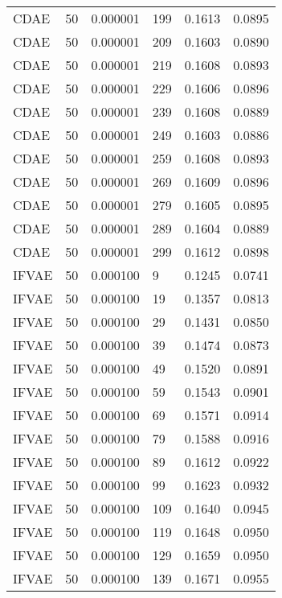 \begin{tabular}{llrlrr}
    CDAE &   50 &  0.000001 &   199 &  0.1613 &       0.0895 \\
    CDAE &   50 &  0.000001 &   209 &  0.1603 &       0.0890 \\
    CDAE &   50 &  0.000001 &   219 &  0.1608 &       0.0893 \\
    CDAE &   50 &  0.000001 &   229 &  0.1606 &       0.0896 \\
    CDAE &   50 &  0.000001 &   239 &  0.1608 &       0.0889 \\
    CDAE &   50 &  0.000001 &   249 &  0.1603 &       0.0886 \\
    CDAE &   50 &  0.000001 &   259 &  0.1608 &       0.0893 \\
    CDAE &   50 &  0.000001 &   269 &  0.1609 &       0.0896 \\
    CDAE &   50 &  0.000001 &   279 &  0.1605 &       0.0895 \\
    CDAE &   50 &  0.000001 &   289 &  0.1604 &       0.0889 \\
    CDAE &   50 &  0.000001 &   299 &  0.1612 &       0.0898 \\
   IFVAE &   50 &  0.000100 &     9 &  0.1245 &       0.0741 \\
   IFVAE &   50 &  0.000100 &    19 &  0.1357 &       0.0813 \\
   IFVAE &   50 &  0.000100 &    29 &  0.1431 &       0.0850 \\
   IFVAE &   50 &  0.000100 &    39 &  0.1474 &       0.0873 \\
   IFVAE &   50 &  0.000100 &    49 &  0.1520 &       0.0891 \\
   IFVAE &   50 &  0.000100 &    59 &  0.1543 &       0.0901 \\
   IFVAE &   50 &  0.000100 &    69 &  0.1571 &       0.0914 \\
   IFVAE &   50 &  0.000100 &    79 &  0.1588 &       0.0916 \\
   IFVAE &   50 &  0.000100 &    89 &  0.1612 &       0.0922 \\
   IFVAE &   50 &  0.000100 &    99 &  0.1623 &       0.0932 \\
   IFVAE &   50 &  0.000100 &   109 &  0.1640 &       0.0945 \\
   IFVAE &   50 &  0.000100 &   119 &  0.1648 &       0.0950 \\
   IFVAE &   50 &  0.000100 &   129 &  0.1659 &       0.0950 \\
   IFVAE &   50 &  0.000100 &   139 &  0.1671 &       0.0955 \\

\end{tabular}

